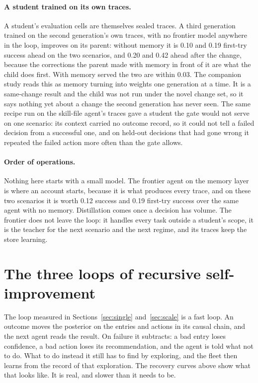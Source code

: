 \documentclass[11pt]{article}
\begin{document}
\paragraph{A student trained on its own traces.} A student's evaluation cells are themselves
sealed traces. A third generation trained on the second generation's own traces, with no
frontier model anywhere in the loop, improves on its parent: without memory it is 0.10 and
0.19 first-try success ahead on the two scenarios, and 0.20 and 0.42 ahead after the change,
because the corrections the parent made with memory in front of it are what the child does
first. With memory served the two are within 0.03. The companion study reads this as memory
turning into weights one generation at a time. It is a same-change result and the child was not
run under the novel change set, so it says nothing yet about a change the second generation has
never seen. The same recipe run on the skill-file agent's traces gave a student the gate would
not serve on one scenario: its context carried no outcome record, so it could not tell a failed
decision from a successful one, and on held-out decisions that had gone wrong it repeated the
failed action more often than the gate allows.

\paragraph{Order of operations.} Nothing here starts with a small model. The frontier agent on
the memory layer is where an account starts, because it is what produces every trace, and on
these two scenarios it is worth 0.12 success and 0.19 first-try success over the same agent
with no memory. Distillation comes once a decision has volume. The frontier does not leave the
loop: it handles every task outside a student's scope, it is the teacher for the next scenario
and the next regime, and its traces keep the store learning.

\section{The three loops of recursive self-improvement}
\label{sec:recursive}

The loop measured in Sections~\ref{sec:single} and~\ref{sec:scale} is a fast loop. An outcome
moves the posterior on the entries and actions in its causal chain, and the next agent reads
the result. On failure it subtracts: a bad entry loses confidence, a bad action loses its
recommendation, and the agent is told what not to do. What to do instead it still has to find
by exploring, and the fleet then learns from the record of that exploration. The recovery
curves above show what that looks like. It is real, and slower than it needs to be.
\end{document}
